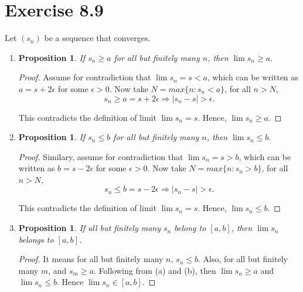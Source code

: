\documentclass{article}
\newtheorem{proposition}[thm]{Proposition}
\begin{document}
\section*{Exercise 8.9}
Let $(s_n)$ be a sequence that converges.
\begin{enumerate}[label=(\alph*)]
    \item 
    \begin{proposition}
        If $s_n\ge a$ for all but finitely many $n$, then $\lim s_n\ge a$.
    \end{proposition}
    \begin{proof}
        Assume for contradiction that $\lim s_n=s<a$, which 
        can be written as $a = s+2\epsilon$ for some $\epsilon>0$. Now take $N = max\{n:s_n<a\}$, 
        for all $n>N$, $$s_n \ge a = s+2\epsilon\Rightarrow |s_n-s|>\epsilon.$$

        This contradicts the definition of limit $\lim s_n = s$. Hence, $\lim s_n \ge a$.
    \end{proof}
    
    \item
    \begin{proposition}
        If $s_n\le b$ for all but finitely many $n$, then $\lim s_n \le b$.
    \end{proposition}
    \begin{proof}
        Similary, assume for contradiction that $\lim s_n=s>b$, which 
        can be written as $b = s-2\epsilon$ for some $\epsilon>0$. Now take $N = max\{n:s_n>b\}$, 
        for all $n>N$, $$s_n \le b = s-2\epsilon\Rightarrow |s_n-s|>\epsilon.$$
    
        This contradicts the definition of limit $\lim s_n = s$. Hence, $\lim s_n \le b$.
    \end{proof}

    \item
    \begin{proposition}
        If all but finitely many $s_n$ belong to $[a,b]$, then $\lim s_n$ belongs to $[a,b]$.
    \end{proposition}
    \begin{proof}
        It means for all but finitely many $n$, $s_n \le b$. Also, for all but finitely many $m$,
         and $s_m\ge a$. Following from (a) and 
        (b), then $\lim s_n \ge a$ and $\lim s_n \le b$. Hence $\lim s_n \in [a,b]$.
    \end{proof}
\end{enumerate}
\end{document}
